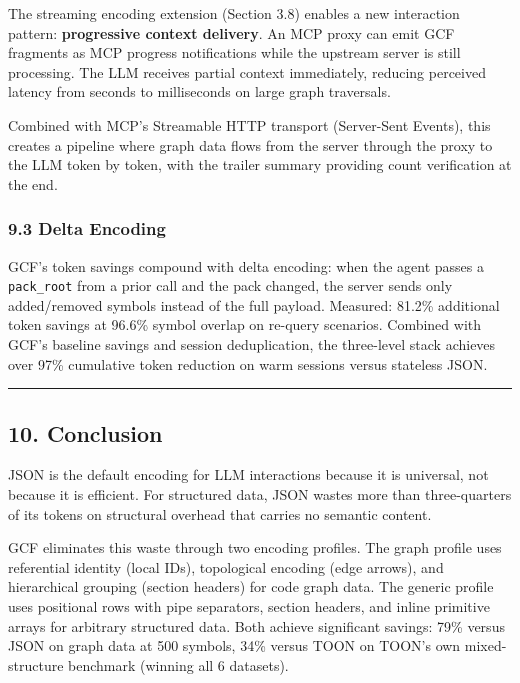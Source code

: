 \documentclass[
  11pt,
  paper=a4,
  ,captions=tableheading
]{scrartcl}
\begin{document}
The streaming encoding extension (Section 3.8) enables a new interaction
pattern: \textbf{progressive context delivery}. An MCP proxy can emit
GCF fragments as MCP progress notifications while the upstream server is
still processing. The LLM receives partial context immediately, reducing
perceived latency from seconds to milliseconds on large graph
traversals.

Combined with MCP's Streamable HTTP transport (Server-Sent Events), this
creates a pipeline where graph data flows from the server through the
proxy to the LLM token by token, with the trailer summary providing
count verification at the end.

\subsubsection{9.3 Delta Encoding}\label{delta-encoding}

GCF's token savings compound with delta encoding: when the agent passes
a \texttt{pack\_root} from a prior call and the pack changed, the server
sends only added/removed symbols instead of the full payload. Measured:
81.2\% additional token savings at 96.6\% symbol overlap on re-query
scenarios. Combined with GCF's baseline savings and session
deduplication, the three-level stack achieves over 97\% cumulative token
reduction on warm sessions versus stateless JSON.

\begin{center}\rule{0.5\linewidth}{0.5pt}\end{center}

\subsection{10. Conclusion}\label{conclusion}

JSON is the default encoding for LLM interactions because it is
universal, not because it is efficient. For structured data, JSON wastes
more than three-quarters of its tokens on structural overhead that
carries no semantic content.

GCF eliminates this waste through two encoding profiles. The graph
profile uses referential identity (local IDs), topological encoding
(edge arrows), and hierarchical grouping (section headers) for code
graph data. The generic profile uses positional rows with pipe
separators, section headers, and inline primitive arrays for arbitrary
structured data. Both achieve significant savings: 79\% versus JSON on
graph data at 500 symbols, 34\% versus TOON on TOON's own
mixed-structure benchmark (winning all 6 datasets).
\end{document}
